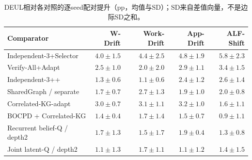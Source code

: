 \documentclass[sigconf,anonymous,review]{acmart}
\theoremstyle{zhplain}
\begin{document}
\begin{table}[t]
\centering
\caption{DEUL相对各对照的逐seed配对提升（pp，均值与SD）；SD来自差值向量，不是边际SD之和。}
\label{tab:diff}
\small
\begin{tabular}{@{}lrrrr@{}}
\toprule
Comparator & W-Drift & Work-Drift & App-Drift & ALF-Shift \\
\midrule
Independent-3+Selector & \(4.0\!\pm\!1.5\) & \(4.4\!\pm\!2.5\) & \(4.8\!\pm\!1.9\) & \(5.8\!\pm\!2.3\) \\
Verify-All+Adapt & \(2.5\!\pm\!1.0\) & \(2.0\!\pm\!2.0\) & \(2.9\!\pm\!1.1\) & \(3.4\!\pm\!1.5\) \\
Independent-3++ & \(1.3\!\pm\!0.6\) & \(1.1\!\pm\!0.6\) & \(2.4\!\pm\!1.2\) & \(2.6\!\pm\!1.4\) \\
SharedGraph / separate & \(1.7\!\pm\!0.7\) & \(2.7\!\pm\!1.3\) & \(1.9\!\pm\!1.0\) & \(2.0\!\pm\!0.8\) \\
Correlated-KG-adapt & \(3.0\!\pm\!0.7\) & \(3.1\!\pm\!1.1\) & \(3.2\!\pm\!1.0\) & \(1.6\!\pm\!1.1\) \\
BOCPD + Correlated-KG & \(1.4\!\pm\!0.4\) & \(1.7\!\pm\!1.4\) & \(1.5\!\pm\!0.7\) & \(0.9\!\pm\!1.1\) \\
Recurrent belief-Q / depth2 & \(1.7\!\pm\!1.3\) & \(1.5\!\pm\!1.7\) & \(1.9\!\pm\!0.4\) & \(1.3\!\pm\!0.8\) \\
Joint latent-Q / depth2 & \(1.1\!\pm\!1.3\) & \(1.7\!\pm\!1.1\) & \(1.1\!\pm\!1.2\) & \(1.4\!\pm\!1.5\) \\
\bottomrule
\end{tabular}
\end{table}

\end{document}
